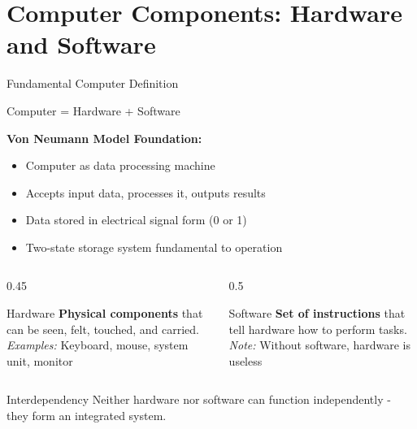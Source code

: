 \documentclass[aspectratio=169]{beamer}
\begin{document}
\section{Computer Components: Hardware and Software}

\begin{frame}{Fundamental Computer Definition}
    \begin{definition}
        Computer = Hardware + Software
    \end{definition}
    
    \vspace{0.3cm}
    \textbf{Von Neumann Model Foundation:}
    \begin{itemize}
        \item Computer as data processing machine
        \item Accepts input data, processes it, outputs results
        \item Data stored in electrical signal form (0 or 1)
        \item Two-state storage system fundamental to operation
    \end{itemize}
    
    \vspace{0.5cm}
    \begin{columns}
        \begin{column}{0.45\textwidth}
            \begin{block}{Hardware}
                \textbf{Physical components} that can be seen, felt, touched, and carried.
                \\
                \textit{Examples:} Keyboard, mouse, system unit, monitor
            \end{block}
        \end{column}
        \begin{column}{0.5\textwidth}
            \begin{block}{Software}
                \textbf{Set of instructions} that tell hardware how to perform tasks.
                \\
                \textit{Note:} Without software, hardware is useless
            \end{block}
        \end{column}
    \end{columns}
    
    \begin{alertblock}{Interdependency}
        Neither hardware nor software can function independently - they form an integrated system.
    \end{alertblock}
\end{frame}
\end{document}
